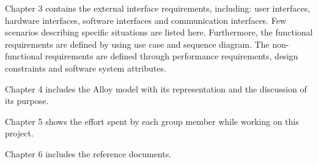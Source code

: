 Chapter 3 contains the external interface requirements, including: user interfaces, hardware interfaces,
software interfaces and communication interfaces. Few scenarios describing specific situations are listed
here. Furthermore, the functional requirements are defined by using use case and sequence diagram.
The non-functional requirements are defined through performance requirements, design constraints
and software system attributes.\newline

Chapter 4 includes the Alloy model with its representation and the discussion of its purpose.\newline

Chapter 5 shows the effort spent by each group member while working on this project.\newline

Chapter 6 includes the reference documents.

%